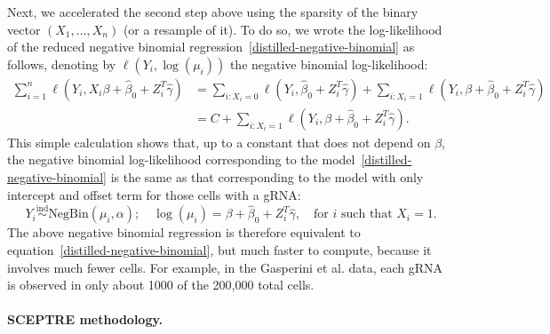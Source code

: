 \documentclass{article}
\begin{document}
Next, we accelerated the second step above using the sparsity of the binary vector $(X_1, \dots, X_n)$ (or a resample of it). To do so, we wrote the log-likelihood of the reduced negative binomial regression~\eqref{distilled-negative-binomial} as follows, denoting by $\ell(Y_i, \log(\mu_i))$ the negative binomial log-likelihood:
\begin{equation*}
\begin{split}
\sum_{i = 1}^n \ell(Y_i, X_i \beta + \widehat \beta_0 + Z_i^T \widehat \gamma) &= \sum_{i: X_i = 0} \ell(Y_i, \widehat \beta_0 + Z_i^T \widehat \gamma) + \sum_{i: X_i = 1} \ell(Y_i, \beta + \widehat \beta_0 + Z_i^T \widehat \gamma) \\
&= C + \sum_{i: X_i = 1} \ell(Y_i, \beta + \widehat \beta_0 + Z_i^T \widehat \gamma).
\end{split}
\end{equation*}
This simple calculation shows that, up to a constant that does not depend on $\beta$, the negative binomial log-likelihood corresponding to the model~\eqref{distilled-negative-binomial} is the same as that corresponding to the model with only intercept and offset term for those cells with a gRNA:
\begin{equation}
Y_i \overset{\text{ind}}\sim \textrm{NegBin}(\mu_i, \alpha); \quad \log(\mu_i) = \beta + \widehat \beta_0 + Z_i^T \widehat \gamma, \quad \text{for } i \text{ such that } X_i = 1.
\label{distilled-negative-binomial-accelerated}
\end{equation}
The above negative binomial regression is therefore equivalent to equation~\eqref{distilled-negative-binomial}, but much faster to compute, because it involves much fewer cells. For example, in the Gasperini et al. data, each gRNA is observed in only about 1000 of the 200,000 total cells.

\paragraph{SCEPTRE methodology.}
\end{document}
